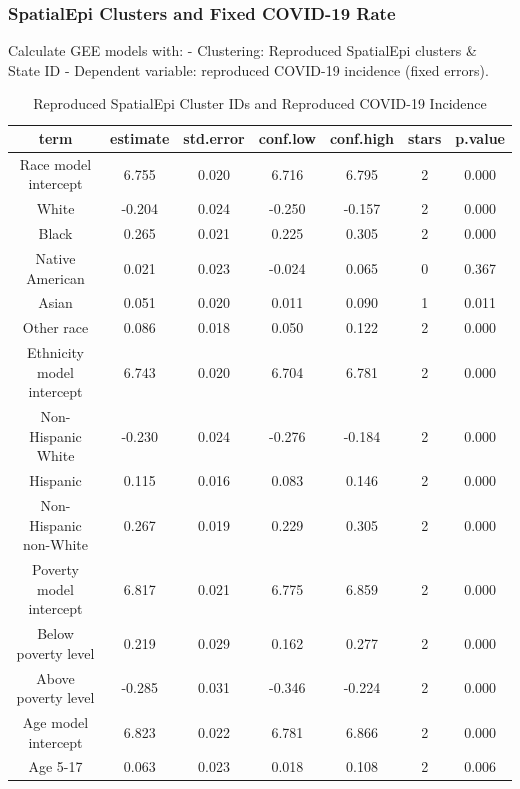 \documentclass[
]{article}
\begin{document}
\hypertarget{spatialepi-clusters-and-fixed-covid-19-rate}{%
\subsubsection{SpatialEpi Clusters and Fixed COVID-19
Rate}\label{spatialepi-clusters-and-fixed-covid-19-rate}}

Calculate GEE models with: - Clustering: Reproduced SpatialEpi clusters
\& State ID - Dependent variable: reproduced COVID-19 incidence (fixed
errors).

\begin{table}

\caption{\label{tab:gee-spatialepi-clusters-reproduced-incidence}Reproduced SpatialEpi Cluster IDs and Reproduced COVID-19 Incidence}
\centering
\begin{tabular}[t]{c|c|c|c|c|c|c}
\hline
term & estimate & std.error & conf.low & conf.high & stars & p.value\\
\hline
Race model intercept & 6.755 & 0.020 & 6.716 & 6.795 & 2 & 0.000\\
\hline
White & -0.204 & 0.024 & -0.250 & -0.157 & 2 & 0.000\\
\hline
Black & 0.265 & 0.021 & 0.225 & 0.305 & 2 & 0.000\\
\hline
Native American & 0.021 & 0.023 & -0.024 & 0.065 & 0 & 0.367\\
\hline
Asian & 0.051 & 0.020 & 0.011 & 0.090 & 1 & 0.011\\
\hline
Other race & 0.086 & 0.018 & 0.050 & 0.122 & 2 & 0.000\\
\hline
Ethnicity model intercept & 6.743 & 0.020 & 6.704 & 6.781 & 2 & 0.000\\
\hline
Non-Hispanic White & -0.230 & 0.024 & -0.276 & -0.184 & 2 & 0.000\\
\hline
Hispanic & 0.115 & 0.016 & 0.083 & 0.146 & 2 & 0.000\\
\hline
Non-Hispanic non-White & 0.267 & 0.019 & 0.229 & 0.305 & 2 & 0.000\\
\hline
Poverty model intercept & 6.817 & 0.021 & 6.775 & 6.859 & 2 & 0.000\\
\hline
Below poverty level & 0.219 & 0.029 & 0.162 & 0.277 & 2 & 0.000\\
\hline
Above poverty level & -0.285 & 0.031 & -0.346 & -0.224 & 2 & 0.000\\
\hline
Age model intercept & 6.823 & 0.022 & 6.781 & 6.866 & 2 & 0.000\\
\hline
Age 5-17 & 0.063 & 0.023 & 0.018 & 0.108 & 2 & 0.006\\

\end{tabular}
\end{table}
\end{document}
